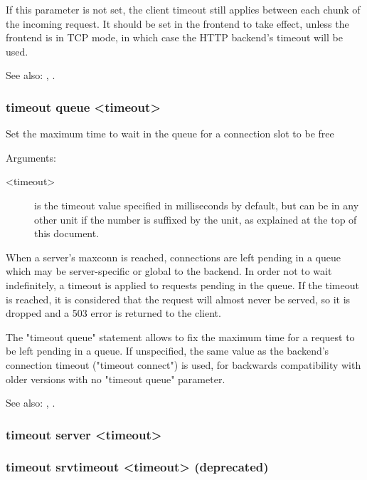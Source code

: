   If this parameter is not set, the client timeout still applies between each
  chunk of the incoming request. It should be set in the frontend to take
  effect, unless the frontend is in TCP mode, in which case the HTTP backend's
  timeout will be used.

  See also: , .

\subsubsection[timeout queue]{timeout queue <timeout>}

  Set the maximum time to wait in the queue for a connection slot to be free


  Arguments:
  \begin{description}
  \item[<timeout>] is the timeout value specified in milliseconds by default, but
              can be in any other unit if the number is suffixed by the unit,
              as explained at the top of this document.
  \end{description}

  When a server's maxconn is reached, connections are left pending in a queue
  which may be server-specific or global to the backend. In order not to wait
  indefinitely, a timeout is applied to requests pending in the queue. If the
  timeout is reached, it is considered that the request will almost never be
  served, so it is dropped and a 503 error is returned to the client.

  The "timeout queue" statement allows to fix the maximum time for a request to
  be left pending in a queue. If unspecified, the same value as the backend's
  connection timeout ("timeout connect") is used, for backwards compatibility
  with older versions with no "timeout queue" parameter.

  See also: , .

\subsubsection[timeout server]{timeout server <timeout>}
\subsubsection[timeout srvtimeout]{timeout srvtimeout <timeout> (deprecated)}

